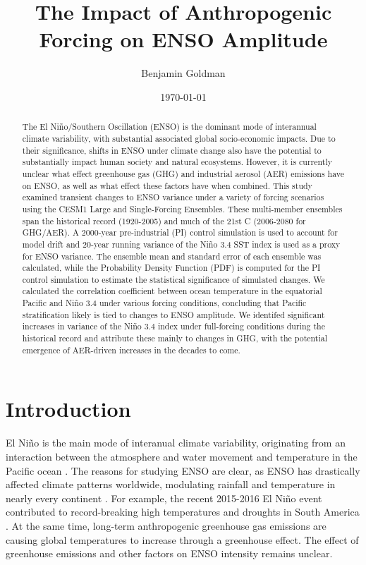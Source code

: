 \documentclass[11pt]{article}
\author{Benjamin Goldman}
\date{\today}
\title{The Impact of Anthropogenic Forcing on ENSO Amplitude}
\begin{document}
\maketitle
\begin{abstract}

    The El Niño/Southern Oscillation (ENSO) is the dominant mode of interannual climate variability, with substantial associated global socio-economic impacts. Due to their significance, shifts in ENSO under climate change also have the potential to substantially impact human society and natural ecosystems. However, it is currently unclear what effect greenhouse gas (GHG) and industrial aerosol (AER) emissions have on ENSO, as well as what effect these factors have when combined. This study examined transient changes to ENSO variance under a variety of forcing scenarios using the CESM1 Large and Single-Forcing Ensembles. These multi-member ensembles span the historical record (1920-2005) and much of the 21st C (2006-2080 for GHG/AER). A 2000-year pre-industrial (PI) control simulation is used to account for model drift and 20-year running variance of the Niño 3.4 SST index is used as a proxy for ENSO variance. The ensemble mean and standard error of each ensemble was calculated, while the Probability Density Function (PDF) is computed for the PI control simulation to estimate the statistical significance of simulated changes. We calculated the correlation coefficient between ocean temperature in the equatorial Pacific and Niño 3.4 under various forcing conditions, concluding that Pacific stratification likely is tied to changes to ENSO amplitude. We identifed significant increases in variance of the Niño 3.4 index under full-forcing conditions during the historical record and attribute these mainly to changes in GHG, with the potential emergence of AER-driven increases in the decades to come.

\end{abstract}

\section{Introduction}
\label{sec:org7fb1b29}
El Niño is the main mode of interanual climate variability, originating from an interaction between the atmosphere and water movement and temperature in the Pacific ocean \citep{bjerknes1969atmospheric}. The reasons for studying ENSO are clear, as ENSO has drastically affected climate patterns worldwide, modulating rainfall and temperature in nearly every continent \citep{ropelewski1987global}. For example, the recent 2015-2016 El Niño event contributed to record-breaking high temperatures and droughts in South America \citep{jimenez2016record}. At the same time, long-term anthropogenic greenhouse gas emissions are causing global temperatures to increase through a greenhouse effect. The effect of greenhouse emissions and other factors on ENSO intensity remains unclear.
\end{document}
